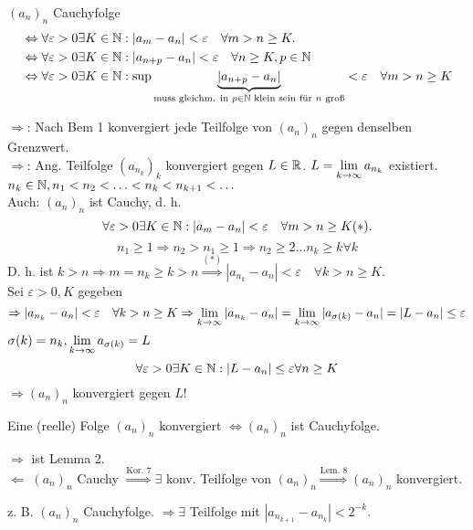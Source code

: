 \begin{bem}
	\( (a_n)_n \) Cauchyfolge \\
	\begin{align*}
		&\Leftrightarrow \forall \varepsilon>0\exists K\in\mathbb{N}:|a_m-a_n|<\varepsilon \quad \forall m>n\geq K.\\
		&\Leftrightarrow \forall \varepsilon>0\exists K\in\mathbb{N}:|a_{n+p}-a_n|<\varepsilon \quad \forall n\geq K, p\in\mathbb{N}\\
		&\Leftrightarrow \forall \varepsilon>0\exists K\in\mathbb{N}:\sup \underbrace{|a_{n+p}-a_n|}_{\text{muss gleichm. in }p\in\mathbb{N}\text{ klein sein für } n \text{ groß} }<\varepsilon \quad \forall m>n\geq K
	\end{align*}
\end{bem}
\begin{bew}
	\glqq\( \Rightarrow \)\grqq: Nach Bem 1 konvergiert jede Teilfolge von \( (a_n)_n \) gegen denselben Grenzwert.\\
	\glqq\(\Rightarrow\)\grqq: Ang. Teilfolge \( (a_{n_k})_k \) konvergiert gegen \(L\in\mathbb{R}\). \(L = \lim\limits_{k\rightarrow\infty} a_{n_k} \) existiert.\\
	\( n_k\in\mathbb{N}, n_1<n_2<\ldots<n_k<n_{k+1}<\ldots \)\\
	Auch: \((a_n)_n\) ist Cauchy, d. h. 
	\[ \forall \varepsilon>0\exists K\in\mathbb{N}:|a_m-a_n|<\varepsilon \quad\forall m>n\geq K (*). \]
	\[n_1 \geq 1 \Rightarrow n_2 > n_1 \geq 1 \Rightarrow n_2 \geq 2 \ldots n_k \geq k \forall k \]
	D. h. ist \(k>n \Rightarrow m=n_k \geq k>n \overset{(*)}{\Rightarrow} |a_{n_k}-a_n|<\varepsilon \quad \forall k>n\geq K \).\\
	Sei \( \varepsilon>0, K\) gegeben\\
	\[ \Rightarrow |a_{n_k} - a_n| <\varepsilon \quad \forall k>n\geq K \Rightarrow \lim\limits_{k\rightarrow\infty} |a_{n_k}-a_n| = \lim\limits_{k\rightarrow\infty} |a_{\sigma(k)}-a_n| = |L-a_n| \leq \varepsilon \]
	\(\sigma(k) = n_k, \lim\limits_{k\rightarrow\infty} a_{\sigma(k)} = L \)
	\[ \forall \varepsilon>0 \exists K\in\mathbb{N}: |L-a_n|\leq \varepsilon \forall n\geq K \]
	\(\Rightarrow (a_n)_n\) konvergiert gegen \(L\)!
\end{bew}
\begin{satz}
	Eine (reelle) Folge \((a_n)_n\) konvergiert \( \Leftrightarrow (a_n)_n \) ist Cauchyfolge.
\end{satz}
\begin{bew}
	\glqq\(\Rightarrow\)\grqq{} ist Lemma 2.\\
	\glqq \( \Leftarrow \)\grqq{} \((a_n)_n\) Cauchy \( \overset{\text{Kor. 7}}{\Rightarrow} \exists \) konv. Teilfolge von \((a_n)_n \overset{\text{Lem. 8}}{\Rightarrow} (a_n)_n \) konvergiert. 
\end{bew}
z. B. \((a_n)_n\) Cauchyfolge. \(\Rightarrow \exists\) Teilfolge mit \(|a_{n_{k+1}}-a_{n_k}| <2^{-k}\).
